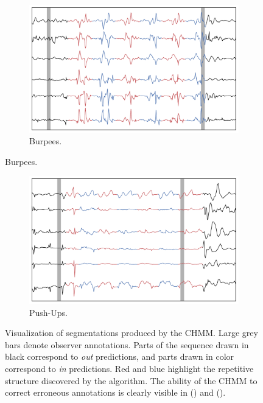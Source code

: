 \documentclass[12pt]{report}
\newcommand{\1}[0]{\mathbbm{1}}
\begin{document}
\begin{figure}[H]
    \centering
    \ContinuedFloat
    \begin{subfigure}{\textwidth}
        \includegraphics[width=\textwidth]{img/segmentation/burpee.pdf}
        \caption{Burpees.}
        \label{fig:actseg:burpee}
    \end{subfigure}
\end{figure}

\begin{figure}[H]
    \centering
    \ContinuedFloat
    \begin{subfigure}{\textwidth}
        \includegraphics[width=1\textwidth]{img/segmentation/push_up.pdf}
        \caption{Push-Ups.}
        \label{fig:actseg:push-up}
    \end{subfigure}
    \caption[Unsupervised exercise segmentation]{
        Visualization of segmentations produced by the CHMM.
        Large grey bars denote observer annotations. Parts of the sequence drawn
        in black correspond to \emph{out} predictions, and parts drawn in color
        correspond to \emph{in} predictions. Red and blue highlight the repetitive structure
        discovered by the algorithm. The ability of the CHMM to correct erroneous
        annotations is clearly visible in () and ().
    }
    \label{fig:actseg}
\end{figure}
\end{document}
